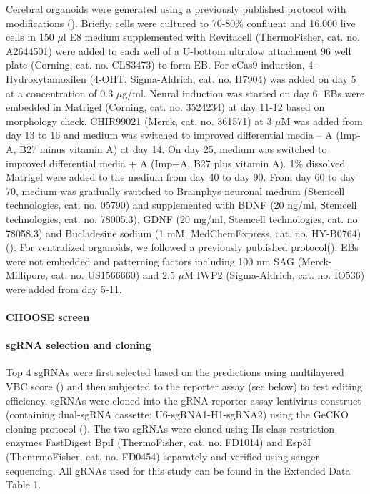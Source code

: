 Cerebral organoids were generated using a previously published protocol with modifications (\cite{lancaster_generation_2014}). Briefly, cells were cultured to 70-80\% confluent and 16,000 live cells in 150 $\mu$l E8 medium supplemented with Revitacell (ThermoFisher, cat. no. A2644501) were added to each well of a U-bottom ultralow attachment 96 well plate (Corning, cat. no. CLS3473) to form EB. For eCas9 induction, 4-Hydroxytamoxifen (4-OHT, Sigma-Aldrich, cat. no. H7904) was added on day 5 at a concentration of 0.3 $\mu$g/ml. Neural induction was started on day 6. EBs were embedded in Matrigel (Corning, cat. no. 3524234) at day 11-12 based on morphology check. CHIR99021 (Merck, cat. no. 361571) at 3 $\mu$M was added from day 13 to 16 and medium was switched to improved differential media – A (Imp-A, B27 minus vitamin A) at day 14. On day 25, medium was switched to improved differential media + A (Imp+A, B27 plus vitamin A). 1\% dissolved Matrigel were added to the medium from day 40 to day 90. From day 60 to day 70, medium was gradually switched to Brainphys neuronal medium (Stemcell technologies, cat. no. 05790) and supplemented with BDNF (20 ng/ml, Stemcell technologies, cat. no. 78005.3), GDNF (20 mg/ml, Stemcell technologies, cat. no. 78058.3) and Bucladesine sodium (1 mM, MedChemExpress, cat. no. HY-B0764)(\cite{eichmuller_amplification_2022}). For ventralized organoids, we followed a previously published protocol(\cite{bagley_fused_2017}). EBs were not embedded and patterning factors including 100 nm SAG (Merck-Millipore, cat. no. US1566660) and 2.5 $\mu$M IWP2 (Sigma-Aldrich, cat. no. IO536)  were added from day 5-11.


\paragraph{CHOOSE screen}

\paragraph{sgRNA selection and cloning}
Top 4 sgRNAs were first selected based on the predictions using multilayered VBC score (\cite{michlits_multilayered_2020}) and then subjected to the reporter assay (see below) to test editing efficiency. sgRNAs were cloned into the gRNA reporter assay lentivirus construct (containing dual-sgRNA cassette: U6-sgRNA1-H1-sgRNA2) using the GeCKO cloning protocol (\cite{sanjana_improved_2014}). The two sgRNAs were cloned using IIs class restriction enzymes FastDigest BpiI (ThermoFisher, cat. no. FD1014) and Esp3I (ThemrmoFisher, cat. no. FD0454) separately and verified using sanger sequencing. All gRNAs used for this study can be found in the Extended Data Table 1.  


